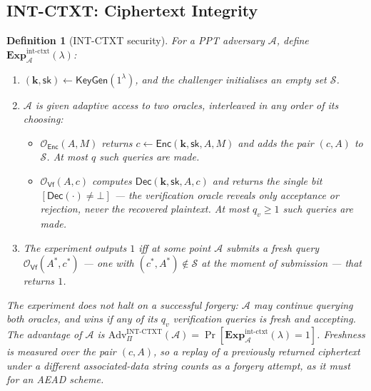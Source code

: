 \documentclass[11pt,a4paper]{article}
\newtheorem{definition}[theorem]{Definition}
\begin{document}
\subsection{INT-CTXT: Ciphertext Integrity}
\label{sec:int-ctxt}

\begin{definition}[INT-CTXT security]\label{def:int-ctxt}
For a PPT adversary $\mathcal{A}$, define
$\mathbf{Exp}^{\mathrm{int\text{-}ctxt}}_{\mathcal{A}}(\lambda)$:
\begin{enumerate}
  \item $(\mathbf{k},\mathsf{sk})\gets\mathsf{KeyGen}(1^\lambda)$, and the
        challenger initialises an empty set $\mathcal{S}$.
  \item $\mathcal{A}$ is given adaptive access to two oracles, interleaved
        in any order of its choosing:
        \begin{itemize}
          \item $\mathcal{O}_{\mathsf{Enc}}(A,M)$ returns
                $c\gets\mathsf{Enc}(\mathbf{k},\mathsf{sk},A,M)$ and adds
                the pair $(c,A)$ to $\mathcal{S}$. At most $q$ such queries
                are made.
          \item $\mathcal{O}_{\mathsf{Vf}}(A,c)$ computes
                $\mathsf{Dec}(\mathbf{k},\mathsf{sk},A,c)$ and returns the
                single bit $[\mathsf{Dec}(\cdot)\neq\bot]$ — the
                verification oracle reveals \emph{only} acceptance or
                rejection, never the recovered plaintext. At most $q_v\ge1$
                such queries are made.
        \end{itemize}
  \item The experiment outputs $1$ iff at some point $\mathcal{A}$ submits
        a \emph{fresh} query $\mathcal{O}_{\mathsf{Vf}}(A^*,c^*)$ — one with
        $(c^*,A^*)\notin\mathcal{S}$ \emph{at the moment of submission} —
        that returns $1$.
\end{enumerate}
The experiment does not halt on a successful forgery: $\mathcal{A}$ may
continue querying both oracles, and wins if \emph{any} of its $q_v$
verification queries is fresh and accepting. The advantage of $\mathcal{A}$
is
$\mathrm{Adv}^{\mathrm{INT\text{-}CTXT}}_{\Pi}(\mathcal{A}) =
\Pr[\mathbf{Exp}^{\mathrm{int\text{-}ctxt}}_{\mathcal{A}}(\lambda)=1]$.
Freshness is measured over the \emph{pair} $(c,A)$, so a replay of a
previously returned ciphertext under a different associated-data string
counts as a forgery attempt, as it must for an AEAD scheme.
\end{definition}
\end{document}
